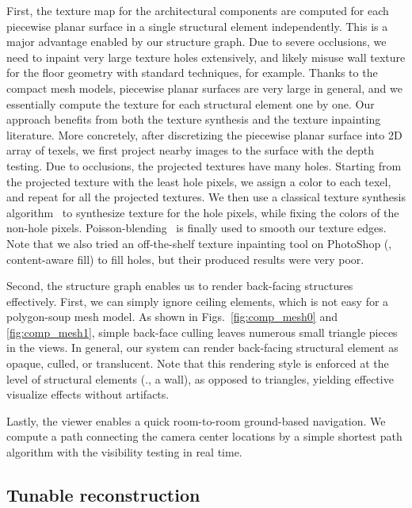 First, the texture map for the architectural components are computed for
each piecewise planar surface in a single structural element
independently. This is a major advantage enabled by our structure
graph. Due to severe occlusions, we need to inpaint very large texture
holes extensively, and likely misuse wall texture for the floor geometry
with standard techniques, for example. Thanks to the compact mesh
models, piecewise planar surfaces are very large in general, and we
essentially compute the texture for each structural element one by
one. Our approach benefits from both the texture synthesis and the
texture inpainting literature. More concretely, after discretizing the
piecewise planar surface into 2D array of texels, we first project
nearby images to the surface with the depth testing. Due to occlusions,
the projected textures have many holes. Starting from the projected
texture with the least hole pixels, we assign a color to each texel, and
repeat for all the projected textures. We then use a classical texture
synthesis algorithm~\cite{efros1999texture} to synthesize texture for
the hole pixels, while fixing the colors of the non-hole
pixels. Poisson-blending~\cite{perez2003poisson} is finally used to
smooth our texture edges. Note that we also tried an off-the-shelf
texture inpainting tool on PhotoShop (\ie, content-aware fill) to fill
holes, but their produced results were very poor.

Second, the structure graph enables us to render back-facing structures
effectively. First, we can simply ignore ceiling elements, which is not
easy for a polygon-soup mesh model. As shown in
Figs.~\ref{fig:comp_mesh0} and \ref{fig:comp_mesh1},
simple back-face culling leaves numerous small triangle pieces in the
views. In general, our system can render back-facing structural element
as opaque, culled, or translucent. Note that this rendering style is
enforced at the level of structural elements (\eg., a wall), as opposed
to triangles, yielding effective visualize effects without artifacts.

Lastly, the viewer enables a quick room-to-room ground-based
navigation. We compute a path connecting the camera center locations by
a simple shortest path algorithm with the visibility testing in real time.


\subsection{Tunable reconstruction}

